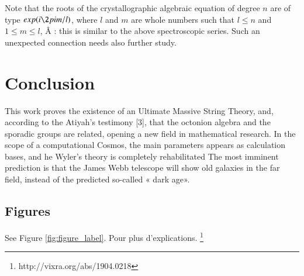 \documentclass[a4paper,9pt]{article}
\begin{document}
    
    Note that the roots of the crystallographic algebraic equation of degree $n$ are of type $exp(i\2pi m/l)$, where $l$ and $m$ are whole numbers such that $l \le n$ and $1 \le m \le l$, Â : this is similar to the above spectroscopic series. Such an unexpected connection needs also further study.


\section{Conclusion}

This work proves the existence of an Ultimate Massive String Theory, and, according to the Atiyah's testimony [3], that the octonion algebra and the sporadic groups are related, opening a new field in mathematical research. In the scope of a computational Cosmos, the main parameters appears as calculation bases, and he Wyler's theory is completely rehabilitated  The most imminent prediction is that the James Webb telescope will show old galaxies in the far field, instead of the predicted so-called « dark age».


\subsection{Figures}

See Figure \ref{fig:figure_label}. Pour plus d'explications. \footnote{http://vixra.org/abs/1904.0218}
 
\end{document}
